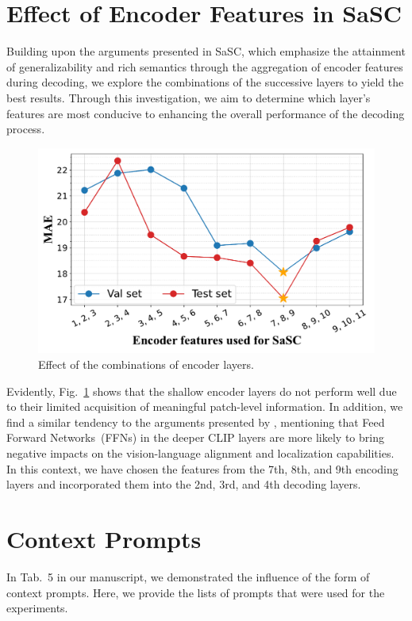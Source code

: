 \section{Effect of Encoder Features in SaSC}
Building upon the arguments presented in SaSC, which emphasize the attainment of generalizability and rich semantics through the aggregation of encoder features during decoding, we explore the combinations of the successive layers to yield the best results.
Through this investigation, we aim to determine which layer's features are most conducive to enhancing the overall performance of the decoding process.
\begin{figure}[ht]
    \begin{center}
    \includegraphics[width=\linewidth]{figs/SaSC_ablation.pdf}
    \end{center}
    \caption{
        Effect of the combinations of encoder layers.
    }
    \label{fig:sasc}
\end{figure}

Evidently, Fig.~\ref{fig:sasc} shows that the shallow encoder layers do not perform well due to their limited acquisition of meaningful patch-level information.
In addition, we find a similar tendency to the arguments presented by \cite{li2023clipsurgery}, mentioning that  Feed Forward Networks~(FFNs) in the deeper CLIP layers are more likely to bring negative impacts on the vision-language alignment and localization capabilities.
In this context, we have chosen the features from the 7th, 8th, and 9th encoding layers and incorporated them into the 2nd, 3rd, and 4th decoding layers.

\section{Context Prompts}
In Tab.~5 in our manuscript, we demonstrated the influence of the form of context prompts.
Here, we provide the lists of prompts that were used for the experiments.

